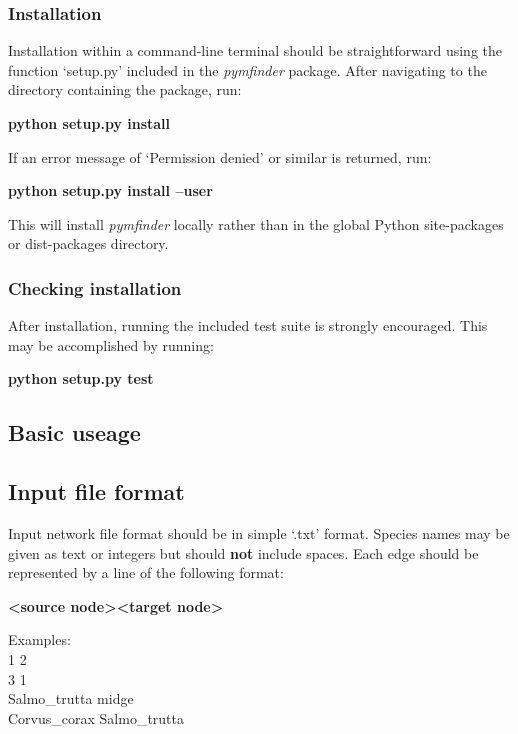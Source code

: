\documentclass[12pt]{article}
\begin{document}
		\subsubsection{Installation}

			Installation within a command-line terminal should be straightforward using the function `setup.py' included in the \emph{pymfinder} package. After navigating to the directory containing the package, run:

			\textbf{python setup.py install}

			If an error message of `Permission denied' or similar is returned, run:

			\textbf{python setup.py install --user}

			This will install \emph{pymfinder} locally rather than in the global Python site-packages or dist-packages directory. 


		\subsubsection{Checking installation}

			After installation, running the included test suite is strongly encouraged. This may be accomplished by running:

			\textbf{python setup.py test}



	\subsection{Basic useage}


		\subsection{Input file format}

			Input network file format should be in simple `.txt' format. Species names may be given as text or integers but should \textbf{not} include spaces. Each edge should be represented by a line of the following format:

			\textbf{\textless source node\textgreater  \textless target node\textgreater}

			Examples:\\
			1 2\\
			3 1\\
			Salmo\_trutta midge\\
			Corvus\_corax Salmo\_trutta\\
\end{document}
